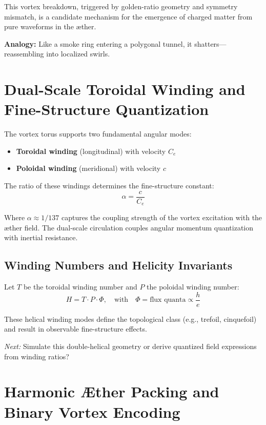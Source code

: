 \documentclass[11pt]{article}
\begin{document}
This vortex breakdown, triggered by golden-ratio geometry and symmetry mismatch, is a candidate mechanism for the emergence of charged matter from pure waveforms in the æther.

\textbf{Analogy:} Like a smoke ring entering a polygonal tunnel, it shatters---reassembling into localized swirls.

\section*{Dual-Scale Toroidal Winding and Fine-Structure Quantization}

The vortex torus supports two fundamental angular modes:

\begin{itemize}
  \item \textbf{Toroidal winding} (longitudinal) with velocity $C_e$
  \item \textbf{Poloidal winding} (meridional) with velocity $c$
\end{itemize}

The ratio of these windings determines the fine-structure constant:
\begin{equation}
    \alpha = \frac{c}{C_e}
\end{equation}

Where $\alpha \approx 1/137$ captures the coupling strength of the vortex excitation with the æther field. The dual-scale circulation couples angular momentum quantization with inertial resistance.

\subsection*{Winding Numbers and Helicity Invariants}

Let $T$ be the toroidal winding number and $P$ the poloidal winding number:
\begin{equation}
    H = T \cdot P \cdot \Phi, \quad \text{with} \quad \Phi = \text{flux quanta} \propto \frac{h}{e}
\end{equation}

These helical winding modes define the topological class (e.g., trefoil, cinquefoil) and result in observable fine-structure effects.

\textit{Next:} Simulate this double-helical geometry or derive quantized field expressions from winding ratios?

\section*{Harmonic Æther Packing and Binary Vortex Encoding}
\end{document}
